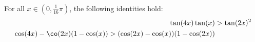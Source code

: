 

\begin{Lemma}
For all $x\in \left(0, \frac{1}{16}\pi\right)$, the following identities hold:
\begin{align*}
\tan(4x)\tan(x) &> \tan(2x)^2\\
\cos(4x) - \co(2x) (1 - \cos(x)) > (\cos(2x) - \cos(x)) (1 - \cos(2x))
\end{align*}
\end{Lemma}